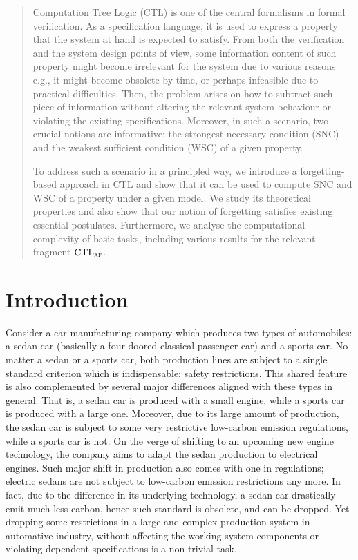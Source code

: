 \documentclass{article}
\begin{document}
\begin{abstract}
Computation Tree Logic (CTL) is one of the central formalisms in formal verification. As a specification language, it is used to express a property
that the system at hand is expected to satisfy. From
both the verification and the system design points
of view, some information content of such property might become irrelevant for the system due to
various reasons e.g., it might become obsolete by
time, or perhaps infeasible due to practical difficulties. Then, the problem arises on how to subtract such piece of information without altering the
relevant system behaviour or violating the existing
specifications. Moreover, in such a scenario, two
crucial notions are informative: the strongest necessary condition (SNC) and the weakest sufficient
condition (WSC) of a given property.


To address such a scenario in a principled way, we
introduce a forgetting-based approach in CTL and
show that it can be used to compute SNC and WSC
of a property under a given model. We study its
theoretical properties and also show that our notion
of forgetting satisfies existing essential postulates.
Furthermore, we analyse the computational complexity of basic tasks, including various results for
the relevant fragment $\textrm{CTL}_{\textsc{a}\textsc{f}}$.

\end{abstract}

\section{Introduction}


Consider a car-manufacturing company which produces two types of automobiles: a sedan car (basically a four-doored classical passenger car) and a sports car.  No matter a sedan or a sports car, both production lines are subject to a single standard criterion which is indispensable: safety restrictions.  This shared feature is also complemented by several major differences aligned with these types in general. That is, a sedan car is produced with a small engine, while a sports car is produced with a large one. Moreover, due to its large amount of production, the sedan car is subject to some very restrictive low-carbon emission regulations, while a sports car is not. On the verge of shifting to an upcoming new engine technology, the company aims to adapt the sedan production to electrical engines. Such major shift in production also comes with one in regulations; electric sedans are not subject to low-carbon emission restrictions any more. In fact, due to the difference in its underlying technology, a sedan car drastically emit much less carbon, hence such standard is obsolete, and can be dropped. Yet dropping some restrictions in a large and complex production system in automative industry, without affecting the working system components or violating dependent specifications  is a non-trivial task. 
\end{document}
